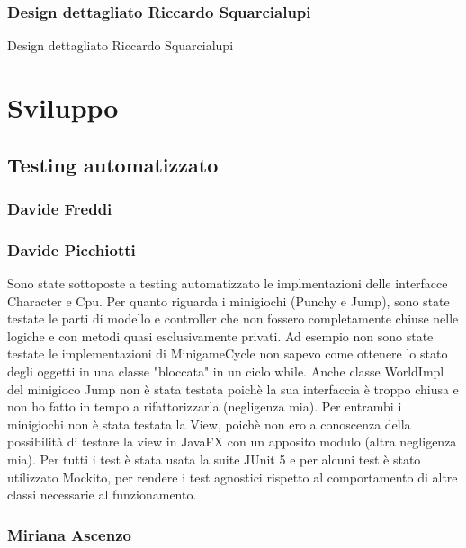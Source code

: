 \documentclass[a4paper,12pt]{report}
\begin{document}
	\subsection{Design dettagliato Riccardo Squarcialupi}
	Design dettagliato Riccardo Squarcialupi

	\chapter{Sviluppo}
	\section{Testing automatizzato}

	\subsection{Davide Freddi}
	\subsection{Davide Picchiotti}

    Sono state sottoposte a testing automatizzato le implmentazioni delle interfacce Character e Cpu.
    Per quanto riguarda i minigiochi (Punchy e Jump), sono state testate le parti di modello e controller che
    non fossero completamente chiuse nelle logiche e con metodi quasi esclusivamente privati.\newline
    Ad esempio non sono state testate le implementazioni di MinigameCycle non sapevo come ottenere lo stato degli oggetti
    in una classe "bloccata" in un ciclo while.\newline
    Anche classe WorldImpl del minigioco Jump non è stata testata poichè la sua interfaccia è troppo chiusa e non ho fatto in tempo a
    rifattorizzarla (negligenza mia).\newline
    Per entrambi i minigiochi non è stata testata la View, poichè non ero a conoscenza della possibilità di testare la view in JavaFX con
    un apposito modulo (altra negligenza mia).\newline
    \newline
    Per tutti i test è stata usata la suite JUnit 5 e per alcuni test è stato utilizzato Mockito, per rendere i test agnostici
    rispetto al comportamento di altre classi necessarie al funzionamento.

	\subsection{Miriana Ascenzo}
\end{document}
